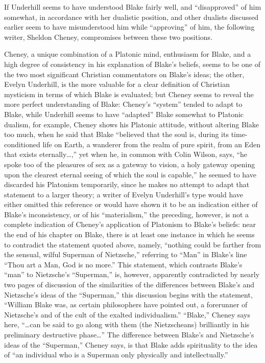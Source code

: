 If Underhill seems to have understood Blake fairly well, and \enquote{disapproved} of him somewhat, in accordance with her
dualistic position, and other dualists discussed earlier seem to have misunderstood him while \enquote{approving} of him, the
following writer, Sheldon Cheney, compromises between these two positions.

Cheney, a unique combination of a Platonic mind, enthusiasm for Blake, and a high degree of consistency in his explanation
of Blake's beliefs, seems to be one of the two most significant Christian commentators on Blake's ideas; the other,
Evelyn Underhill, is the more valuable for a clear definition of Christian mysticism in terms of which Blake is evaluated;
but Cheney seems to reveal the more perfect understanding of Blake: Cheney's \enquote{system} tended
to adapt to Blake, while Underhill seems to have \enquote{adapted} Blake somewhat to Platonic dualism,
for example, Cheney shows his Platonic attitude, without altering Blake too much, when he said that
Blake \enquote{believed that the soul is, during its time-conditioned life on Earth, a wanderer from
the realm of pure spirit, from an Eden that exists eternally\dots,}\supercite{cheney:walked-with-god}
yet when he, in common with Colin Wilson, says, \enquote{he spoke too of the pleasures of sex as a gateway to vision, a holy gateway
opening upon the clearest eternal seeing of which the soul is capable,}\supercite{cheney:walked-with-god}
he seemed to have discarded his Platonism temporarily, since he makes no attempt to adapt that statement to a larger theory; a
writer of Evelyn Underhill's type would have either omitted this reference or would have shown it to be an indication
either of Blake's inconsistency, or of his \enquote{materialism,} the preceding, however, is not a complete indication
of Cheney's application of Platonism to Blake's beliefs: near the end of his chapter on Blake, there is at least one
instance in which he seems to contradict the statement quoted above, namely, \enquote{nothing could be farther from the sensual, wilful Superman
of Nietzsche,}\supercite{cheney:walked-with-god}
referring to \enquote{Man} in Blake's line \enquote{Thou art a Man, God is no more.} This statement, which
contrasts Blake's \enquote{man} to Nietzsche's \enquote{Superman,} is, however, apparently contradicted by nearly two pages of discussion
of the similarities of the differences between Blake's and Nietzsche's ideas of the \enquote{Superman,} this discussion
begins with the statement, \enquote{William Blake was, as certain philosophers have pointed out, a forerunner of Nietzsche's and
of the cult of the exalted individualism.}\supercite{cheney:walked-with-god}
\enquote{Blake,} Cheney says here, \enquote{\dots can be said to go along with them (the Nietzscheans)
brilliantly in his preliminary destructive phase\dots}
The difference between Blake's and Nietzsche's ideas of the\supercite{cheney:walked-with-god}
\enquote{Superman,} Cheney says, is that Blake adds spirituality to the idea of
\enquote{an individual who is a Superman only physically and intellectually.}\supercite{cheney:walked-with-god}

